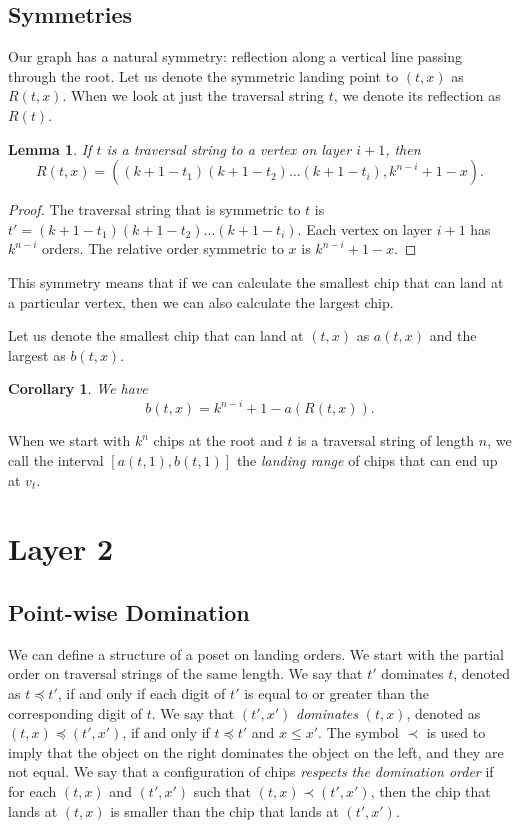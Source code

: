 \documentclass[11pt]{article}
\newtheorem{corollary}{Corollary}[theorem] %
\newtheorem{lemma}[theorem]{Lemma} %
\theoremstyle{definition}
\theoremstyle{remark}
\begin{document}
\subsection{Symmetries}

Our graph has a natural symmetry: reflection along a vertical line passing through the root. Let us denote the symmetric landing point to $(t,x)$ as $R(t,x)$. When we look at just the traversal string $t$, we denote its reflection as $R(t)$.

\begin{lemma}
    If $t$ is a traversal string to a vertex on layer $i+1$, then 
    \[R(t,x) = \left((k+1-t_1)(k+1-t_2)\dots (k+1-t_{i}), k^{n-i} + 1 -x\right).\]
\end{lemma}

\begin{proof}
    The traversal string that is symmetric to $t$ is $t' = (k+1-t_1)(k+1-t_2)\dots (k+1-t_{i})$. Each vertex on layer $i+1$ has $k^{n-i}$ orders. The relative order symmetric to $x$ is $k^{n-i} + 1 -x$.
\end{proof}

This symmetry means that if we can calculate the smallest chip that can land at a particular vertex, then we can also calculate the largest chip.

Let us denote the smallest chip that can land at $(t,x)$ as $a(t,x)$ and the largest as $b(t,x)$.

\begin{corollary}\label{cor:btx}
    We have
    \[b(t,x) = k^{n-i}+1 - a(R(t,x)).\]
\end{corollary}

When we start with $k^n$ chips at the root and $t$ is a traversal string of length $n$, we call the interval $[a(t, 1), b(t, 1)]$ the \textit{landing range} of chips that can end up at $v_t$.



\section{Layer 2}
\label{sec:layer2}
\subsection{Point-wise Domination}

We can define a structure of a poset on landing orders. We start with the partial order on traversal strings of the same length. We say that $t'$ dominates $t$, denoted as $t \preceq t'$, if and only if each digit of $t'$ is equal to or greater than the corresponding digit of $t$. We say that $(t',x')$ \textit{dominates} $(t,x)$, denoted as $(t,x) \preceq (t',x')$, if and only if $t \preceq t'$ and $x \leq x'$. The symbol $\prec$ is used to imply that the object on the right dominates the object on the left, and they are not equal. We say that a configuration of chips \textit{respects the domination order} if for each $(t, x)$ and $(t', x')$ such that $(t, x) \prec (t', x')$, then the chip that lands at $(t, x)$ is smaller than the chip that lands at $(t', x')$.
\end{document}
